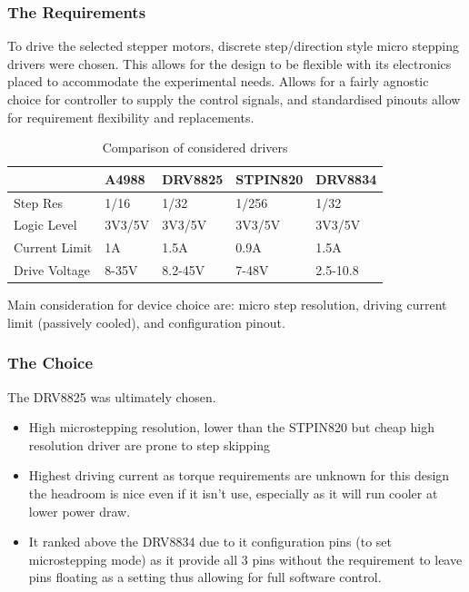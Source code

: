 \subsubsection*{The Requirements}
To drive the selected stepper motors, discrete step/direction style micro stepping drivers were chosen. This allows for the design to be flexible with its electronics placed to accommodate the experimental needs. Allows for a fairly agnostic choice for controller to supply the control signals, and standardised pinouts allow for requirement flexibility and replacements.

\begin{table}[h]
    \centering
    \begin{tabular}{|l|l|l|l|l|}
        \hline
        \textbf{}     & \textbf{A4988} & \textbf{DRV8825} & \textbf{STPIN820} & \textbf{DRV8834} \\ \hline
        Step Res      & 1/16           & 1/32             & 1/256             & 1/32             \\ \hline
        Logic Level   & 3V3/5V         & 3V3/5V           & 3V3/5V            & 3V3/5V           \\ \hline
        Current Limit & 1A             & 1.5A             & 0.9A              & 1.5A             \\ \hline
        Drive Voltage & 8-35V          & 8.2-45V          & 7-48V             & 2.5-10.8         \\ \hline
    \end{tabular}
    \caption{Comparison of considered drivers}
\end{table}

Main consideration for device choice are: micro step resolution, driving current limit (passively cooled), and configuration pinout.

\subsubsection*{The Choice}
The DRV8825 was ultimately chosen.
\begin{itemize}
    \item High microstepping resolution, lower than the STPIN820 but cheap high resolution driver are prone to step skipping \cite{step_book}
    \item Highest driving current as torque requirements are unknown for this design the headroom is nice even if it isn't use, especially as it will run cooler at lower power draw.
    \item It ranked above the DRV8834 due to it configuration pins (to set microstepping mode) as it provide all 3 pins without the requirement to leave pins floating as a setting thus allowing for full software control.
\end{itemize}

